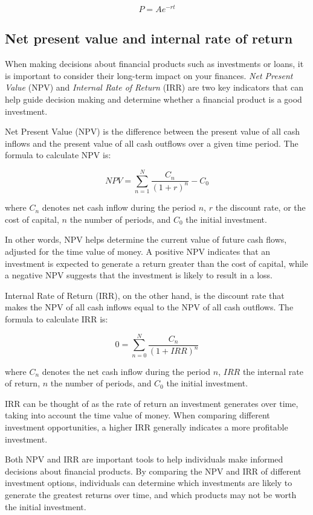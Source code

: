 \documentclass[
  12pt,
  oneside]{book}
\theoremstyle{definition}
\theoremstyle{definition}
\theoremstyle{definition}
\theoremstyle{definition}
\theoremstyle{remark}
\begin{document}
\[
P=Ae^{-rt}
\]

\hypertarget{net-present-value-and-internal-rate-of-return}{%
\subsection{Net present value and internal rate of return}\label{net-present-value-and-internal-rate-of-return}}

When making decisions about financial products such as investments or loans, it is important to consider their long-term impact on your finances. \emph{Net Present Value} (NPV) and \emph{Internal Rate of Return} (IRR) are two key indicators that can help guide decision making and determine whether a financial product is a good investment.

Net Present Value (NPV) is the difference between the present value of all cash inflows and the present value of all cash outflows over a given time period. The formula to calculate NPV is:

\[ NPV = \sum_{n=1}^{N} \frac{C_n}{(1+r)^n} - C_0 \]

where \(C_n\) denotes net cash inflow during the period \(n\), \(r\) the discount rate, or the cost of capital, \(n\) the number of periods, and \(C_0\) the initial investment.

In other words, NPV helps determine the current value of future cash flows, adjusted for the time value of money. A positive NPV indicates that an investment is expected to generate a return greater than the cost of capital, while a negative NPV suggests that the investment is likely to result in a loss.

Internal Rate of Return (IRR), on the other hand, is the discount rate that makes the NPV of all cash inflows equal to the NPV of all cash outflows. The formula to calculate IRR is:

\[ 0 = \sum_{n=0}^{N} \frac{C_n}{(1+IRR)^n}  \]

where \(C_n\) denotes the net cash inflow during the period \(n\), \(IRR\) the internal rate of return, \(n\) the number of periods, and \(C_0\) the initial investment.

IRR can be thought of as the rate of return an investment generates over time, taking into account the time value of money. When comparing different investment opportunities, a higher IRR generally indicates a more profitable investment.

Both NPV and IRR are important tools to help individuals make informed decisions about financial products. By comparing the NPV and IRR of different investment options, individuals can determine which investments are likely to generate the greatest returns over time, and which products may not be worth the initial investment.
\end{document}
